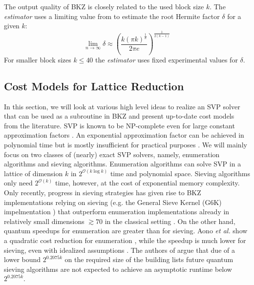 The output quality of BKZ is closely related to the used block size $k$. The \textit{estimator} uses a limiting value from \cite{Chen13} to estimate the root Hermite factor $\delta$ for a given $k$:
\begin{equation}
  \lim_{n\rightarrow \infty} \delta \approx \left( \frac{k (\pi k)^{\frac{1}{k}}}{2\pi e}\right)^{\frac{1}{2(k-1)}}
\end{equation}
For smaller block sizes $k\leq 40$ the \textit{estimator} uses fixed experimental values for $\delta$.





\subsection{Cost Models for Lattice Reduction} \label{sec:costmodels}
In this section, we will look at various high level ideas to realize an SVP solver that can be used as a subroutine in BKZ and present up-to-date cost models from the literature. SVP is known to be NP-complete even for large constant approximation factors \cite{Ajt98, Khot05}. An exponential approximation factor can be achieved in polynomial time but is mostly insufficient for practical purposes \cite{LLL82}.  We will mainly focus on two classes of (nearly) exact SVP solvers, namely, enumeration algorithms and sieving algorithms. Enumeration algorithms can solve SVP in a lattice of dimension $k$ in $2^{\mathcal{O}(k \log k)}$ time and polynomial space. Sieving algorithms only need $2^{\mathcal{O}(k)}$ time, however, at the cost of exponential memory complexity. Only recently, progress in sieving strategies has given rise to BKZ implementations relying on sieving (e.g. the General Sieve Kernel (G6K) impelmentation \cite{ADHKPS19, DSW21}) that outperform enumeration implementations already in relatively small dimensions $\gtrsim 70$ in the classical setting \cite{ABLR21}. On the other hand, quantum speedups for enumeration are greater than for sieving. Aono \textit{et al.} show a quadratic cost reduction for enumeration \cite{ANS18}, while the speedup is much lower for sieving, even with idealized assumptions \cite{Laa15}. The authors of \cite{ADPS16} argue that due of a lower bound $2^{0.2075k}$ on the required size of the building lists future quantum sieving algorithms are not expected to achieve an asymptotic runtime below $2^{0.2075k}$. %

